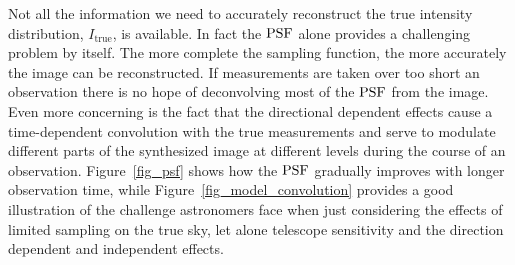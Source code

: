 Not all the information we need to accurately reconstruct the true intensity distribution, $I_{\text{true}}$, is available. In fact the $\textrm{PSF}$ alone provides a challenging
problem by itself. The more complete the sampling function, the more accurately the image can be reconstructed. If measurements are taken over too short an observation there is
no hope of deconvolving most of the $\textrm{PSF}$ from the image. Even more concerning is the fact that the directional dependent effects cause a time-dependent convolution with the
true measurements and serve to modulate different parts of the synthesized image at different levels during the course of an observation. Figure~\ref{fig_psf} shows how the 
$\textrm{PSF}$ gradually improves with longer observation time, while Figure~\ref{fig_model_convolution} provides a good illustration of the challenge astronomers face 
when just considering the effects of limited sampling on the true sky, let alone telescope sensitivity and the direction dependent and independent effects.
